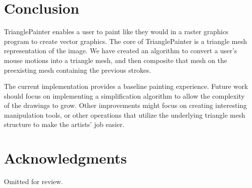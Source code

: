 \documentclass[review]{acmsiggraph}
\begin{document}
\section{Conclusion}
TrianglePainter enables a user to paint like they would in a raster graphics program 
to create vector graphics. The core of TrianglePainter is a triangle mesh representation of the image.
We have created an algorithm to convert a user's mouse motions into a triangle mesh, and then composite
that mesh on the preexisting mesh containing the previous strokes.

The current implementation provides a baseline painting experience. Future work should focus on
implementing a simplification algorithm to allow the complexity of the drawings to grow. Other
improvements might focus on creating interesting manipulation tools, or other operations that utilize
the underlying triangle mesh structure to make the artists' job easier.


\section*{Acknowledgments}

Omitted for review.



\end{document}
